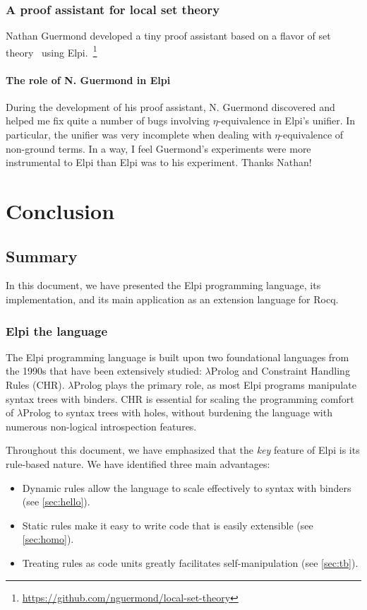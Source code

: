 \documentclass[a4paper, 11pt]{book}
\begin{document}
\subsection{A proof assistant for local set theory}

Nathan Guermond developed a tiny proof assistant based on a flavor of set
theory~\cite{https://doi.org/10.1112/blms/22.1.101} using
Elpi.~\footnote{\url{https://github.com/nguermond/local-set-theory}}


\subsubsection{The role of N. Guermond in Elpi}

During the development of his proof assistant, N. Guermond discovered and
helped me fix quite a number of bugs involving $\eta$-equivalence in Elpi's
unifier. In particular, the unifier was very incomplete when dealing with
$\eta$-equivalence of non-ground terms. In a way, I feel Guermond's
experiments were more instrumental to Elpi than Elpi was to his experiment.
Thanks Nathan!

\chapter{Conclusion}

\section{Summary}


In this document, we have presented the Elpi programming language, its
implementation, and its main application as an extension language for Rocq.

\subsection{Elpi the language}

The Elpi programming language is built upon two foundational languages from the
1990s that have been extensively studied: $\lambda$Prolog and Constraint
Handling Rules (CHR). $\lambda$Prolog plays the primary role, as most Elpi
programs manipulate syntax trees with binders. CHR is essential for scaling the
programming comfort of $\lambda$Prolog to syntax trees with holes, without
burdening the language with numerous non-logical introspection features.

Throughout this document, we have emphasized that the \emph{key} feature of Elpi
is its rule-based nature. We have identified three main advantages:
\begin{itemize}
\item Dynamic rules allow the language to scale effectively to syntax with binders (see \cref{sec:hello}).
\item Static rules make it easy to write code that is easily extensible (see \cref{sec:homo}).
\item Treating rules as code units greatly facilitates self-manipulation (see \cref{sec:tb}).
\end{itemize}
\end{document}
